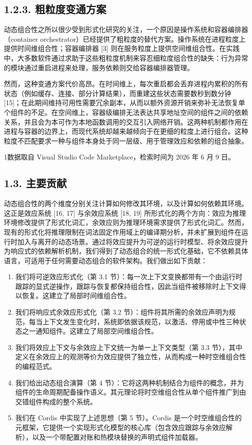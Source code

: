 \subsection{1.2.3. 粗粒度变通方案}\label{the-coarse-grained-workaround}

动态组合性之所以很少受到形式化研究的关注，一个原因是操作系统和容器编排器（container orchestrator）已经提供了粗粒度的替代方案。操作系统在进程粒度上提供时间维组合性；容器编排器 {[}3{]} 则在服务粒度上提供空间维组合性。在实践中，大多数软件通过求助于这些粗粒度机制来容忍细粒度组合性的缺失：行为异常的模块通过重启进程来处理，服务依赖则交给容器编排器管理。

然而，这种变通方案代价高昂。在时间维上，每次重启都会丢弃进程内累积的所有状态（例如缓存、连接、部分计算结果），而重建这些状态需要数秒到数分钟 {[}15{]}；在此期间维持可用性需要冗余副本，从而以额外资源开销来弥补无法恢复单个组件的不足。在空间维上，容器级编排无法表达共享地址空间的组件之间的依赖关系，并且会为本可作为本地函数调用的交互引入网络开销。这两种机制都作用在进程与容器的边界上，而现代系统却越来越倾向于在更细的粒度上进行组合。这种粒度不匹配要求一种与组件本身处于同一层级、用于管理效应和依赖的组合抽象。

1数据取自 Visual Studio Code Marketplace，检索时间为 2026 年 6 月 9 日。

\subsection{1.3. 主要贡献}\label{contributions}

动态组合性的两个维度分别关注计算如何修改其环境，以及计算如何依赖其环境。这正是效应系统 {[}16, 17{]} 与余效应系统 {[}18, 19{]} 所形式化的两个方向：效应为推理环境修改提供了形式化词汇，余效应则为推理环境需求提供了形式化词汇。然而，现有的形式化将推理限制在词法固定作用域上的编译期分析，并未扩展到组件在运行时加入与离开的动态场景。通过将效应提升为可逆的运行时模型、将余效应提升为响应式的依赖解析机制，我们得到了动态组合的统一形式化基础，它不依赖具体语言，可适用于任何需要动态组合的软件架构。我们做出如下贡献：

\begin{enumerate}
\def\labelenumi{\arabic{enumi}.}
\item
  我们将可逆效应形式化（第 3.1 节）：每一次上下文变换都带有一个由运行时跟踪的显式逆操作，跟踪与恢复都保持组合性，因此当组件被移除时上下文得以恢复。这建立了局部时间维组合性。
\item
  我们将响应式余效应形式化（第 3.2 节）：组件将其所需的余效应声明为规范，每当上下文发生变化时，系统即依据该规范，以激活、停用或中性三种状态之一通知组件。这建立了局部空间维组合性。
\item
  我们将效应上下文与余效应上下文统一为单一上下文类型（第 3.3 节），其中定义在余效应上的观测等价为效应提供了独立性，从而构成一种时空维组合性的编程范式。
\item
  我们给出动态组合演算（第 4 节）：它将这两种机制结合为组件的概念，并为组件的生命周期配备操作语义。其元理论将时空维组合性从单个组件推广到由交错组件构成的整个系统。
\item
  我们在 Cordis 中实现了上述思想（第 5 节）。Cordis 是一个时空维组合性的元框架，它提供一个实现形式化模型的核心库（包含效应跟踪与余效应解析），以及一个带配置对账和热模块替换的声明式组件加载器。
\end{enumerate}

